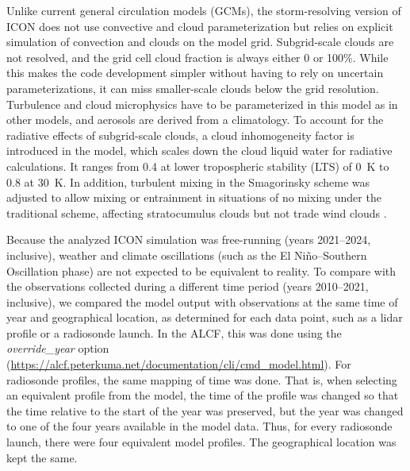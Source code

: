 \documentclass[draft]{agujournal2019}
\begin{document}
Unlike current general circulation models (GCMs), the storm-resolving version of ICON does not use convective and cloud parameterization but relies on explicit simulation of convection and clouds on the model grid. Subgrid-scale clouds are not resolved, and the grid cell cloud fraction is always either 0 or 100\%. While this makes the code development simpler without having to rely on uncertain parameterizations, it can miss smaller-scale clouds below the grid resolution. Turbulence and cloud microphysics have to be parameterized in this model as in other models, and aerosols are derived from a climatology. To account for the radiative effects of subgrid-scale clouds, a cloud inhomogeneity factor is introduced in the model, which scales down the cloud liquid water for radiative calculations. It ranges from 0.4 at lower tropospheric stability (LTS) of 0~K to 0.8 at 30~K. In addition, turbulent mixing in the Smagorinsky scheme was adjusted to allow mixing or entrainment in situations of no mixing under the traditional scheme, affecting stratocumulus clouds but not trade wind clouds \cite{segura2025}.

Because the analyzed ICON simulation was free-running (years 2021--2024, inclusive), weather and climate oscillations (such as the El Niño--Southern Oscillation phase) are not expected to be equivalent to reality. To compare with the observations collected during a different time period (years 2010--2021, inclusive), we compared the model output with observations at the same time of year and geographical location, as determined for each data point, such as a lidar profile or a radiosonde launch. In the ALCF, this was done using the \emph{override\_year} option (\url{https://alcf.peterkuma.net/documentation/cli/cmd_model.html}). For radiosonde profiles, the same mapping of time was done. That is, when selecting an equivalent profile from the model, the time of the profile was changed so that the time relative to the start of the year was preserved, but the year was changed to one of the four years available in the model data. Thus, for every radiosonde launch, there were four equivalent model profiles. The geographical location was kept the same.
\end{document}
